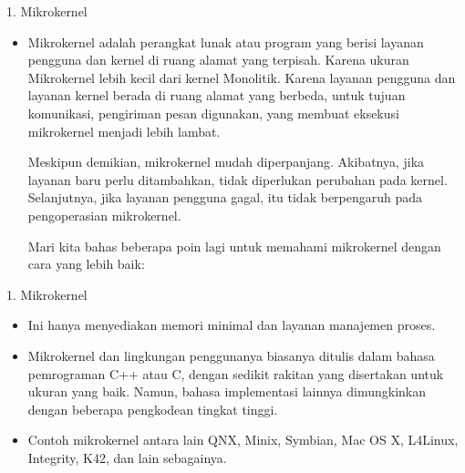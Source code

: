 \documentclass[aspectratio=169, table]{beamer}
\begin{document}
	\begin{frame}{1. Mikrokernel}
		\begin{itemize}

			\item Mikrokernel adalah perangkat lunak atau program yang berisi layanan pengguna dan kernel di ruang alamat yang terpisah. Karena ukuran Mikrokernel lebih kecil dari kernel Monolitik. Karena layanan pengguna dan layanan kernel berada di ruang alamat yang berbeda, untuk tujuan komunikasi, pengiriman pesan digunakan, yang membuat eksekusi mikrokernel menjadi lebih lambat.

			Meskipun demikian, mikrokernel mudah diperpanjang. Akibatnya, jika layanan baru perlu ditambahkan, tidak diperlukan perubahan pada kernel. Selanjutnya, jika layanan pengguna gagal, itu tidak berpengaruh pada pengoperasian mikrokernel.

			Mari kita bahas beberapa poin lagi untuk memahami mikrokernel dengan cara yang lebih baik:



		\end{itemize}
	\end{frame}

	\begin{frame}{1. Mikrokernel}
		\begin{itemize}




			\item Ini hanya menyediakan memori minimal dan layanan manajemen proses.

			\item Mikrokernel dan lingkungan penggunanya biasanya ditulis dalam bahasa pemrograman C++ atau C, dengan sedikit rakitan yang disertakan untuk ukuran yang baik. Namun, bahasa implementasi lainnya dimungkinkan dengan beberapa pengkodean tingkat tinggi.

			\item Contoh mikrokernel antara lain QNX, Minix, Symbian, Mac OS X, L4Linux, Integrity, K42, dan lain sebagainya.
		\end{itemize}
	\end{frame}
\end{document}
